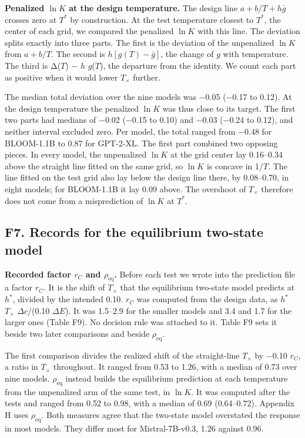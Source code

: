\documentclass[aps,prx,onecolumn,superscriptaddress,longbibliography]{revtex4-2}
\begin{document}
\textbf{Penalized \(\ln K\) at the design temperature.} The design line \(a+b/T+h\bar{g}\) crosses zero at \(T^*\) by construction. At the test temperature closest to \(T^*\), the center of each grid, we compared the penalized \(\ln K\) with this line. The deviation splits exactly into three parts. The first is the deviation of the unpenalized \(\ln K\) from \(a+b/T\). The second is \(h[g(T)-\bar{g}]\), the change of \(g\) with temperature. The third is Δ(\(T\)) − \(h\) \(g\)(\(T\)), the departure from the identity. We count each part as positive when it would lower \(T_{\times}\) further.

The median total deviation over the nine models was −0.05 (−0.17 to 0.12). At the design temperature the penalized \(\ln K\) was thus close to its target. The first two parts had medians of −0.02 (−0.15 to 0.10) and −0.03 (−0.24 to 0.12), and neither interval excluded zero. Per model, the total ranged from −0.48 for BLOOM-1.1B to 0.87 for GPT-2-XL. The first part combined two opposing pieces. In every model, the unpenalized \(\ln K\) at the grid center lay 0.16--0.34 above the straight line fitted on the same grid, so \(\ln K\) is concave in 1/\(T\). The line fitted on the test grid also lay below the design line there, by 0.08--0.70, in eight models; for BLOOM-1.1B it lay 0.09 above. The overshoot of \(T_{\times}\) therefore does not come from a misprediction of \(\ln K\) at \(T^*\).

\subsection*{F7. Records for the equilibrium two-state model}

\textbf{Recorded factor \(r_{C}\) and \(\rho_{\mathrm{eq}}\).} Before each test we wrote into the prediction file a factor \(r_{C}\). It is the shift of \(T_{\times}\) that the equilibrium two-state model predicts at \(h^*\), divided by the intended 0.10. \(r_{C}\) was computed from the design data, as \textbar{}\(h^*\)\textbar{} \(T_{\times}\) \(\Delta c\)/(0.10 \(\Delta E\)). It was 1.5--2.9 for the smaller models and 3.4 and 1.7 for the larger ones (Table F9). No decision rule was attached to it. Table F9 sets it beside two later comparisons and beside \(\rho_{\mathrm{eq}}\).

The first comparison divides the realized shift of the straight-line \(T_{\times}\) by −0.10 \(r_{C}\), a ratio in \(T_{\times}\) throughout. It ranged from 0.53 to 1.26, with a median of 0.73 over nine models. \(\rho_{\mathrm{eq}}\) instead builds the equilibrium prediction at each temperature from the unpenalized arm of the same test, in \(\ln K\). It was computed after the tests and ranged from 0.52 to 0.98, with a median of 0.69 (0.64--0.72). Appendix H uses \(\rho_{\mathrm{eq}}\). Both measures agree that the two-state model overstated the response in most models. They differ most for Mistral-7B-v0.3, 1.26 against 0.96.
\end{document}
